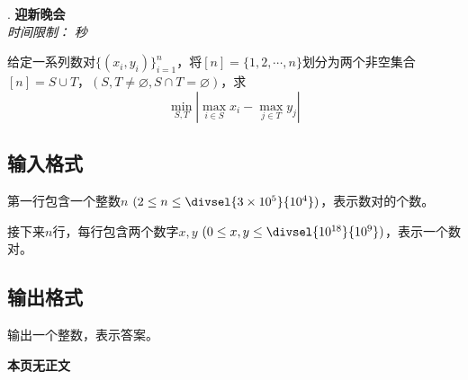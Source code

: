 \addtocounter{ProblemNo}{1}
\renewcommand{\ProblemName}{迎新晚会}
\begin{center}
\huge{. \textbf{\ProblemName}} \\ [0.8cm]
\large{\textit{时间限制：}  \textit{秒}} \\ [1cm] 
\end{center}

给定一系列数对$\{(x_i, y_i)\}_{i=1}^{n}$，将$[n] = \{1, 2, \cdots, n\}$划分为两个非空集合$[n] = S \cup T$，$(S, T \neq \varnothing, S \cap T = \varnothing)$，求
$$
\min_{S, T} | \max_{i \in S} x_i - \max_{j \in T} y_j |
$$

\subsection*{输入格式}

第一行包含一个整数$n$ $(2 \leq n \leq \divsel{3 \times 10^5}{10^4})$，表示数对的个数。

接下来$n$行，每行包含两个数字$x, y$ $(0 \leq x, y \leq \divsel{10^{18}}{10^9})$，表示一个数对。

\subsection*{输出格式}

输出一个整数，表示答案。

\setcounter{ExampleNo}{0}


\clearpage

\ifodd\value{page}
\else
    \vspace*{\fill}
    \begin{center}
    \textbf{\Large 本页无正文}
    \end{center}
    \vspace*{\fill}
    \clearpage
\fi

